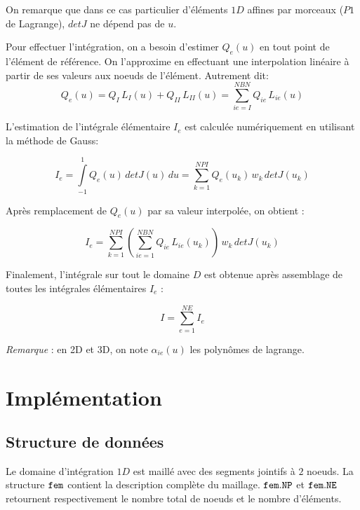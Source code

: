 \documentclass[a4paper, 10pt]{article}
\begin{document}
On remarque que dans ce cas particulier d'éléments $1D$ affines par  morceaux ($P1$ de Lagrange), $detJ$ ne dépend pas de $u$. 

Pour effectuer l'intégration, on a besoin d'estimer $Q_e(u)$ en tout point de l'élément de référence. 
On l'approxime en effectuant une interpolation linéaire à partir de ses valeurs aux noeuds de l'élément.
Autrement dit:
\begin{equation}
Q_e(u)=Q_I\, L_I(u) + Q_{II}\, L_{II}(u)=\sum_{ie=I}^{NBN} Q_{ie}\, L_{ie}(u)
\end{equation}

L'estimation de l'intégrale élémentaire $I_e$ est calculée numériquement en utilisant la
méthode de Gauss:

\begin{equation}
I_e=\int\limits_{-1}^{1} Q_e(u)\, detJ(u)\,  du = \sum_{k=1}^{NPI} Q_e(u_k)\, w_k \, detJ(u_k)
\end{equation}

Après remplacement de $Q_e(u)$ par sa valeur interpolée, on obtient :

\begin{equation}
I_e= \sum_{k=1}^{NPI} \left( \sum_{ie=1}^{NBN} Q_{ie}\, L_{ie}(u_k) \right)\, w_k \, detJ(u_k)
\label{Ie_expr}
\end{equation}

Finalement, l'intégrale sur tout le domaine $D$ est obtenue après assemblage de toutes
les intégrales élémentaires $I_e$ :

\begin{equation}
I = \sum_{e=1}^{NE} I_e
\end{equation}

\textit{Remarque} : en 2D et 3D, on note $\alpha_{ie}(u)$ les polynômes de lagrange.

\section{Implémentation}
\subsection {Structure de données}

Le domaine d'intégration $1D$ est maillé avec des segments jointifs à $2$ noeuds. 
La structure $ \tt{fem }\rm$ contient la description complète du maillage. $ \tt{fem.NP }\rm$  et   $ \tt{fem.NE }\rm$ retournent respectivement le nombre total de noeuds et le nombre d'éléments. 
\end{document}
